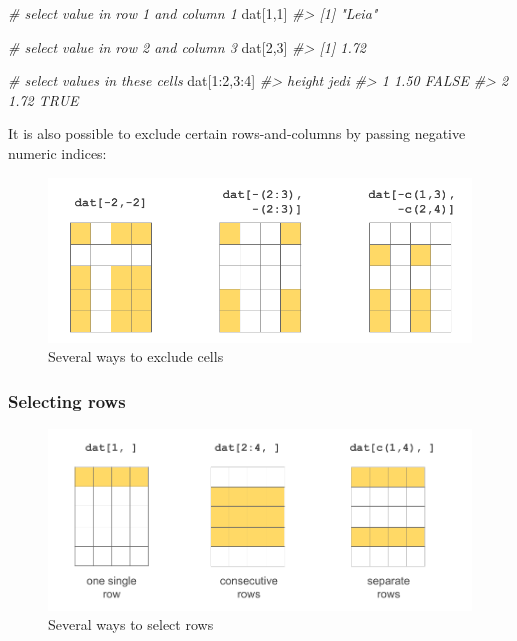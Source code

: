 \documentclass[
]{book}
\newenvironment{Shaded}{\begin{snugshade}}{\end{snugshade}}
\newcommand{\CommentTok}[1]{\textcolor[rgb]{0.56,0.35,0.01}{\textit{#1}}}
\newcommand{\DecValTok}[1]{\textcolor[rgb]{0.00,0.00,0.81}{#1}}
\newcommand{\NormalTok}[1]{#1}
\newcommand{\SpecialCharTok}[1]{\textcolor[rgb]{0.00,0.00,0.00}{#1}}
\begin{document}
\begin{Shaded}
\begin{Highlighting}[]
\CommentTok{\# select value in row 1 and column 1}
\NormalTok{dat[}\DecValTok{1}\NormalTok{,}\DecValTok{1}\NormalTok{]}
\CommentTok{\#\textgreater{} [1] "Leia"}

\CommentTok{\# select value in row 2 and column 3}
\NormalTok{dat[}\DecValTok{2}\NormalTok{,}\DecValTok{3}\NormalTok{]}
\CommentTok{\#\textgreater{} [1] 1.72}

\CommentTok{\# select values in these cells}
\NormalTok{dat[}\DecValTok{1}\SpecialCharTok{:}\DecValTok{2}\NormalTok{,}\DecValTok{3}\SpecialCharTok{:}\DecValTok{4}\NormalTok{]}
\CommentTok{\#\textgreater{}   height  jedi}
\CommentTok{\#\textgreater{} 1   1.50 FALSE}
\CommentTok{\#\textgreater{} 2   1.72  TRUE}
\end{Highlighting}
\end{Shaded}

It is also possible to exclude certain rows-and-columns by passing negative
numeric indices:

\begin{figure}

{\centering \includegraphics[width=0.8\linewidth]{images/objects/obj-dataframe-cells2} 

}

\caption{Several ways to exclude cells}\label{fig:unnamed-chunk-153}
\end{figure}

\hypertarget{selecting-rows}{%
\subsubsection*{Selecting rows}\label{selecting-rows}}

\begin{figure}

{\centering \includegraphics[width=0.8\linewidth]{images/objects/obj-dataframe-rows1} 

}

\caption{Several ways to select rows}\label{fig:unnamed-chunk-154}
\end{figure}
\end{document}
